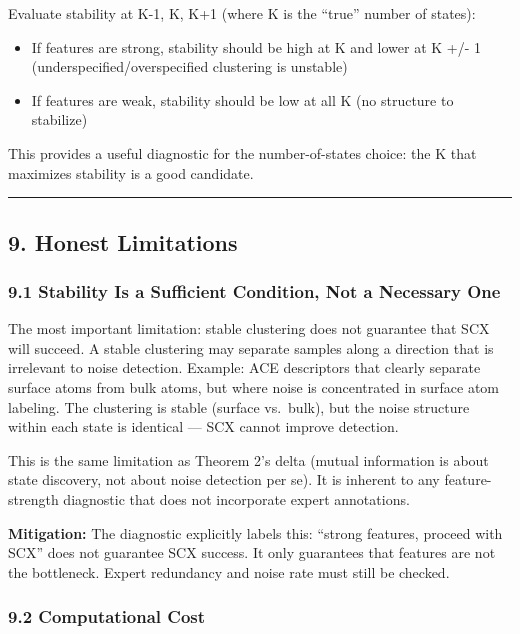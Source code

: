 \documentclass[
  12pt,
]{ctexart}
\providecommand{\tightlist}{%
  \setlength{\itemsep}{0pt}\setlength{\parskip}{0pt}}
\begin{document}
Evaluate stability at K-1, K, K+1 (where K is the ``true'' number of
states):

\begin{itemize}
\tightlist
\item
  If features are strong, stability should be high at K and lower at K
  +/- 1 (underspecified/overspecified clustering is unstable)
\item
  If features are weak, stability should be low at all K (no structure
  to stabilize)
\end{itemize}

This provides a useful diagnostic for the number-of-states choice: the K
that maximizes stability is a good candidate.

\begin{center}\rule{0.5\linewidth}{0.5pt}\end{center}

\subsection{9. Honest Limitations}\label{honest-limitations}

\subsubsection{9.1 Stability Is a Sufficient Condition, Not a Necessary
One}\label{stability-is-a-sufficient-condition-not-a-necessary-one}

The most important limitation: stable clustering does not guarantee that
SCX will succeed. A stable clustering may separate samples along a
direction that is irrelevant to noise detection. Example: ACE
descriptors that clearly separate surface atoms from bulk atoms, but
where noise is concentrated in surface atom labeling. The clustering is
stable (surface vs.~bulk), but the noise structure within each state is
identical --- SCX cannot improve detection.

This is the same limitation as Theorem 2's delta (mutual information is
about state discovery, not about noise detection per se). It is inherent
to any feature-strength diagnostic that does not incorporate expert
annotations.

\textbf{Mitigation:} The diagnostic explicitly labels this: ``strong
features, proceed with SCX'' does not guarantee SCX success. It only
guarantees that features are not the bottleneck. Expert redundancy and
noise rate must still be checked.

\subsubsection{9.2 Computational Cost}\label{computational-cost}
\end{document}
